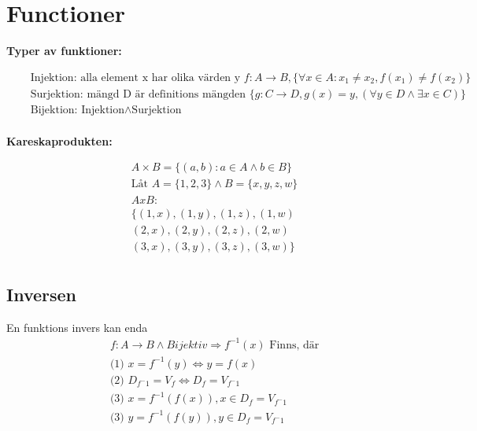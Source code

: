 \newpage

\section{Functioner}
\textbf{Typer av funktioner:}\par 
\begin{align*}
  &\quad  \text{Injektion: alla element x har olika värden y } f: A \to B, \{{\forall x \in A: x_1 \neq x_2, f(x_1) \neq f(x_2)}\} \\
  &\quad  \text{Surjektion: mängd D är definitions mängden } \{g: C \to D, g(x)=y, (\forall y \in D \land \exists x \in C)\} \\
  &\quad  \text{Bijektion: } \text{Injektion} \land \text{Surjektion}  \\
\end{align*}
 
\textbf{Kareskaprodukten:}\par
\begin{align*}
  &\quad  A \times B = \{ (a,b): a \in A \land b \in B \} \\
  &\quad  \text{Låt } A = \{ 1,2,3 \} \land B = \{ x,y,z,w \} \\
  &\quad  A x B : \\
  &\quad  \{ (1,x), (1,y), (1,z), (1,w) \\
  &\quad  (2,x), (2,y), (2,z), (2,w) \\
  &\quad  (3,x), (3,y), (3,z), (3,w) \} \\
\end{align*}

\subsection{Inversen}
En funktions invers kan enda
\begin{align*}
  &\quad  f: A \to B \land Bijektiv \Rightarrow f^{-1}(x) \text{ Finns, där}  \\
  &\quad \text{(1) }  x = f^{-1}(y) \Leftrightarrow y = f(x) \\
  &\quad \text{(2) }  D_{f^-1} = V_f \Leftrightarrow D_f = V_{f^-1} \\
  &\quad \text{(3) }  x = f^{-1}(f(x)), x \in D_f = V_{f^-1} \\ 
  &\quad \text{(3) }  y = f^{-1}(f(y)), y \in D_f = V_{f^-1} \\ 
\end{align*}

